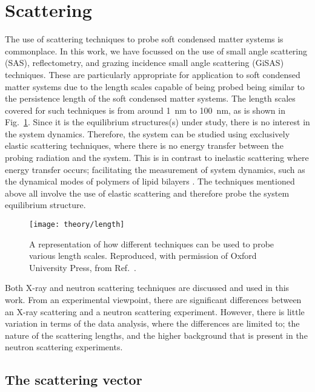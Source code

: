 \section{Scattering}
\label{sec:scattering}

The use of scattering techniques to probe soft condensed matter systems is commonplace.
In this work, we have focussed on the use of small angle scattering (SAS), reflectometry, and grazing incidence small angle scattering (GiSAS) techniques.
These are particularly appropriate for application to soft condensed matter systems due to the length scales capable of being probed being similar to the persistence length of the soft condensed matter systems.
The length scales covered for such techniques is from around \SI{1}{\nano\metre} to \SI{100}{\nano\metre}, as is shown in Fig.~\ref{fig:lengths}.
Since it is the equilibrium structures(s) under study, there is no interest in the system dynamics.
Therefore, the system can be studied using exclusively elastic scattering techniques, where there is no energy transfer between the probing radiation and the system.
This is in contrast to inelastic scattering where energy transfer occurs; facilitating the measurement of system dynamics, such as the dynamical modes of polymers of lipid bilayers \cite{Sakai2009, Farago2009}.
The techniques mentioned above all involve the use of elastic scattering and therefore probe the system equilibrium structure.
%
\begin{figure}
	\centering
	\texttt{[image: theory/length]}
	\caption{A representation of how different techniques can be used to probe various length scales. Reproduced, with permission of Oxford University Press\textsuperscript{\textcopyright}, from Ref.~\cite{Sivia2011}.}
	\label{fig:lengths}
\end{figure}
%

Both X-ray and neutron scattering techniques are discussed and used in this work.
From an experimental viewpoint, there are significant differences between an X-ray scattering and a neutron scattering experiment.
However, there is little variation in terms of the data analysis, where the differences are limited to; the nature of the scattering lengths, and the higher background that is present in the neutron scattering experiments.

\subsection{The scattering vector}

